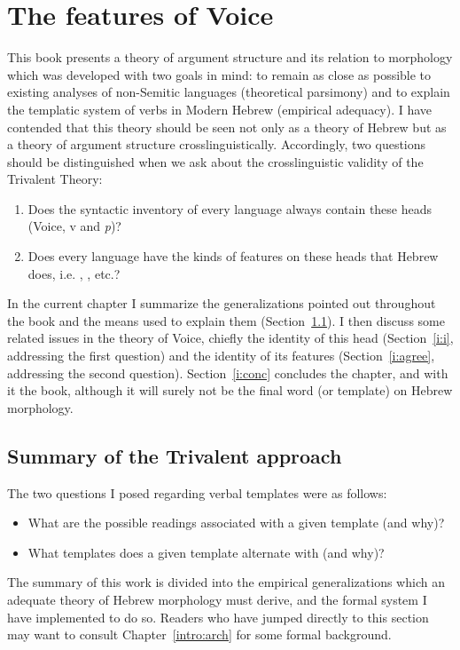 \chapter{The features of Voice}
\label{chap:i}

This book presents a theory of argument structure and its relation to morphology which was developed with two goals in mind: to remain as close as possible to existing analyses of non-Semitic languages (theoretical parsimony) and to explain the templatic system of verbs in Modern Hebrew (empirical adequacy). I have contended that this theory should be seen not only as a theory of Hebrew but as a theory of argument structure crosslinguistically. Accordingly, two questions should be distinguished when we ask about the crosslinguistic validity of the Trivalent Theory:
\begin{enumerate}
	\item Does the syntactic inventory of every language always contain these heads (Voice, v and \emph{p})?
	\item Does every language have the kinds of features on these heads that Hebrew does, i.e. {\vd}, \pz, etc.?
\end{enumerate}

In the current chapter I summarize the generalizations pointed out throughout the book and the means used to explain them (Section~\ref{i:sum}). I then discuss some related issues in the theory of Voice, chiefly the identity of this head (Section~\ref{i:i}, addressing the first question) and the identity of its features (Section~\ref{i:agree}, addressing the second question). Section~\ref{i:conc} concludes the chapter, and with it the book, although it will surely not be the final word (or template) on Hebrew morphology.


\section{Summary of the Trivalent approach} \label{i:sum}
The two questions I posed regarding verbal templates were as follows:
\begin{itemize}
	\item What are the possible readings associated with a given template (and why)?
	\item What templates does a given template alternate with (and why)?
\end{itemize}

The summary of this work is divided into the empirical generalizations which an adequate theory of Hebrew morphology must derive, and the formal system I have implemented to do so. Readers who have jumped directly to this section may want to consult Chapter~\ref{intro:arch} for some formal background.

